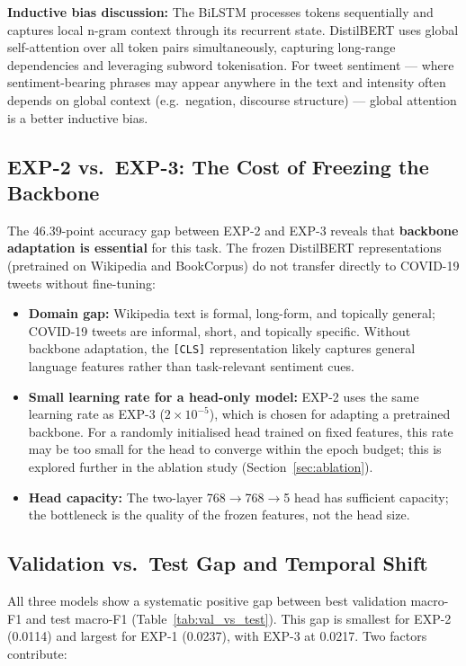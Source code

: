 \textbf{Inductive bias discussion:} The BiLSTM processes tokens sequentially and captures local n-gram context through its recurrent state. DistilBERT uses global self-attention over all token pairs simultaneously, capturing long-range dependencies and leveraging subword tokenisation. For tweet sentiment — where sentiment-bearing phrases may appear anywhere in the text and intensity often depends on global context (e.g.\ negation, discourse structure) — global attention is a better inductive bias.

\subsection{EXP-2 vs.\ EXP-3: The Cost of Freezing the Backbone}

The 46.39-point accuracy gap between EXP-2 and EXP-3 reveals that \textbf{backbone adaptation is essential} for this task. The frozen DistilBERT representations (pretrained on Wikipedia and BookCorpus) do not transfer directly to COVID-19 tweets without fine-tuning:

\begin{itemize}
    \item \textbf{Domain gap:} Wikipedia text is formal, long-form, and topically general; COVID-19 tweets are informal, short, and topically specific. Without backbone adaptation, the \texttt{[CLS]} representation likely captures general language features rather than task-relevant sentiment cues.
    \item \textbf{Small learning rate for a head-only model:} EXP-2 uses the same learning rate as EXP-3 ($2\times10^{-5}$), which is chosen for adapting a pretrained backbone. For a randomly initialised head trained on fixed features, this rate may be too small for the head to converge within the epoch budget; this is explored further in the ablation study (Section~\ref{sec:ablation}).
    \item \textbf{Head capacity:} The two-layer 768$\to$768$\to$5 head has sufficient capacity; the bottleneck is the quality of the frozen features, not the head size.
\end{itemize}

\subsection{Validation vs.\ Test Gap and Temporal Shift}

All three models show a systematic positive gap between best validation macro-F1 and test macro-F1 (Table~\ref{tab:val_vs_test}). This gap is smallest for EXP-2 (0.0114) and largest for EXP-1 (0.0237), with EXP-3 at 0.0217. Two factors contribute:

